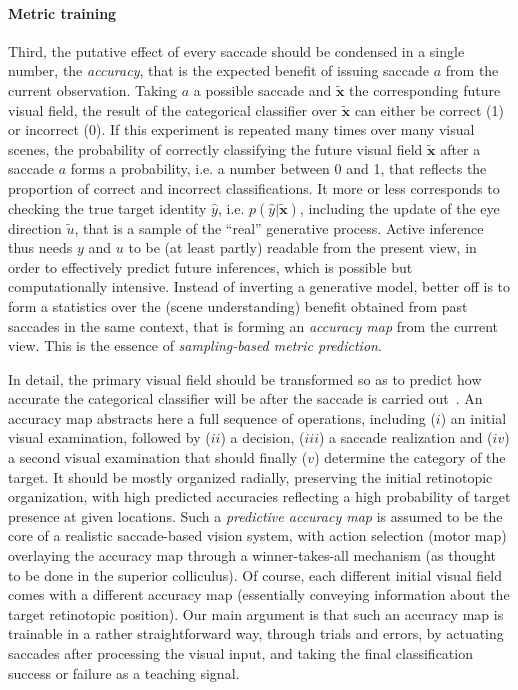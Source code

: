 \paragraph{Metric training}
Third, the putative effect of every saccade should be condensed in a single number, the \emph{accuracy}, that is the expected benefit of issuing saccade $a$ %
from the current observation. Taking $a$ a possible saccade and $\tilde{\boldsymbol{x}}$ the corresponding future visual field, the result of the categorical classifier over $\tilde{\boldsymbol{x}}$ can either be correct (1) or incorrect (0). 
If this experiment is repeated many times over many visual scenes, the probability of correctly classifying the future visual field $\tilde{\boldsymbol{x}}$ after a saccade $a$ forms a probability, i.e. a number between 0 and 1, that reflects the proportion of correct and incorrect classifications.
It more or less corresponds to checking the true target identity $\hat{y}$, i.e. $p(\hat{y}|\tilde{\boldsymbol{x}})$, including the update of the eye direction $\tilde{u}$, that is a sample of the ``real'' generative process. Active inference thus needs $y$ and $u$ to be (at least partly) readable from the present view, in order to effectively predict future inferences, which is possible but computationally intensive.   
Instead of inverting a generative model, better off is to form a statistics over the (scene understanding) benefit obtained from past saccades in the same context, that is forming an \emph{accuracy map} from the current view. This is the essence of \emph{sampling-based metric prediction}.

In detail, the primary visual field should be transformed so as to predict how accurate the categorical classifier will be after the saccade is carried out~\citep{Dauce18}. %
An accuracy map abstracts here a full sequence of operations, including ($i$) an initial visual examination, followed by ($ii$) a decision, ($iii$) a saccade realization and ($iv$) a second visual examination that should finally ($v$) determine the category of the target.
It should be mostly organized radially, preserving the initial retinotopic organization, with high predicted accuracies reflecting a high probability of target presence at given locations.
Such  a \emph{predictive accuracy map} is assumed to be the core of a realistic saccade-based vision system, with action selection (motor map) overlaying the accuracy map through a winner-takes-all mechanism (as thought to be done in the superior colliculus). Of course, each different initial visual field comes with a different accuracy map (essentially conveying information about the target retinotopic position).
Our main argument is that such an accuracy map is trainable in a rather straightforward way, through trials and errors, by actuating saccades after processing the visual input, and taking the final classification success or failure as a teaching signal.

